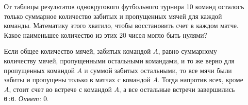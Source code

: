 \problem
От таблицы результатов однокругового футбольного турнира 10 команд осталось
только суммарное количество забитых и пропущенных мячей для каждой команды.
Математику этого хватило, чтобы восстановить счет в каждом матче.
Какое наименьшее количество из этих 20 чисел могло быть нулями?

\solution
Если общее количество мячей, забитых командой $A$, равно суммарному количеству
мячей, пропущенными остальными командами, и то же верно для пропущенных
командой $A$ и суммой забитых остальными, то все мячи были забиты и пропущены
только в матчах с командой $A$.
Тогда напротив всех, кроме $A$, стоит счет во встрече с командой $A$, а все
остальные встречи завершились \texttt{0:0}.
\emph{Ответ:} 0.

\endproblem
